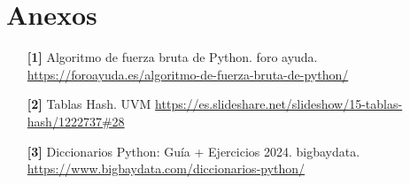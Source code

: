 \documentclass[12pt, twoside]{article}
\begin{document}
\section{Anexos}
\begin{enumerate}
    \item[\textbf{[1]}] Algoritmo de fuerza bruta de Python. foro ayuda. \url{https://foroayuda.es/algoritmo-de-fuerza-bruta-de-python/}
    
    \item[\textbf{[2]}] Tablas Hash. UVM \url{https://es.slideshare.net/slideshow/15-tablas-hash/1222737#28}
    
    \item[\textbf{[3]}] Diccionarios Python: Guía + Ejercicios 2024. bigbaydata. \url{https://www.bigbaydata.com/diccionarios-python/}
\end{enumerate}
\end{document}
